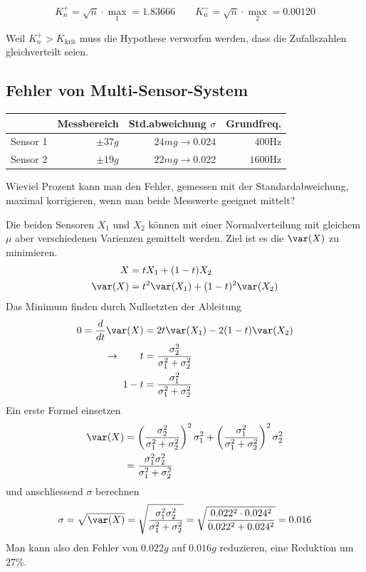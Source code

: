 \[
K_n^+ = \sqrt{n}\cdot \max_1 = 1.83666 \qquad K_n^- = \sqrt{n}\cdot \max_2 = 0.00120
\]

Weil $K_n^+ > K_\text{krit}$ muss die Hypothese verworfen werden, dass die Zufallszahlen gleichverteilt seien.


\subsection{Fehler von Multi-Sensor-System}
\begin{center}
	\begin{tabular}{l|r|r|r}
		& Messbereich & Std.abweichung $\sigma$ & Grundfreq. \\ \toprule
		Sensor 1 & $\pm37g$ & $24mg \rightarrow 0.024$ & $400$Hz  \\  \midrule
		Sensor 2 & $\pm19g$ & $22mg \rightarrow 0.022$ & $1600$Hz \\  \midrule
	\end{tabular}
\end{center}
Wieviel Prozent kann man den Fehler, gemessen mit der Standardabweichung, maximal korrigieren, wenn man beide Messwerte geeignet mittelt?

Die beiden Sensoren $X_1$ und $X_2$ können mit einer Normalverteilung mit gleichem $\mu$ aber verschiedenen Varienzen gemittelt werden. Ziel ist es die $\var(X)$ zu minimieren. 
\begin{align*}
	X &= tX_1 + (1-t)X_2 \\
	\var(X) &= t^2\var(X_1) + (1-t)^2\var(X_2)
\end{align*}
Das Minimum finden durch Nullsetzten der Ableitung
\begin{align*}
	0 = \frac{d}{dt}\var(X) &= 2t\var(X_1) - 2(1-t)\var(X_2) \\
	\rightarrow  \qquad t &= \frac{\sigma_2^2}{\sigma_1^2 + \sigma_2^2} \\
	 1-t &= \frac{\sigma_1^2}{\sigma_1^2 + \sigma_2^2}
\end{align*}
Ein erste Formel einsetzen
\begin{align*}
	\var(X) &= \left(\frac{\sigma_2^2}{\sigma_1^2 + \sigma_2^2}\right)^2\sigma_1^2 + \left(\frac{\sigma_1^2}{\sigma_1^2 + \sigma_2^2}\right)^2\sigma_2^2 \\
	&= \frac{\sigma_1^2\sigma_2^2}{\sigma_1^2+\sigma_2^2}
\end{align*}
und anschliessend $\sigma$ berechnen
\[
\sigma = \sqrt{\var(X)} = \sqrt{\frac{\sigma_1^2\sigma_2^2}{\sigma_1^2+\sigma_2^2}} = \sqrt{\frac{0.022^2\cdot 0.024^2}{0.022^2 + 0.024^2}} = 0.016
\]  
Man kann also den Fehler von $0.022g$ auf $0.016g$ reduzieren, eine Reduktion um $27\%$.